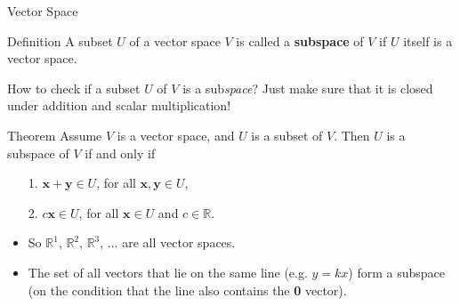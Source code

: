 \documentclass{beamer}
\newcommand{\vx}{\mathbf{x}}
\newcommand{\vy}{\mathbf{y}}
\newcommand{\R}{\mathbb{R}}
\begin{document}
\begin{frame}{Vector Space}
  \begin{block}{Definition}
   A subset $U$ of a vector space $V$ is called a \textbf{subspace} of $V$
 if $U$ itself is a vector space.
\end{block}

\pause How to check if a subset $U$ of $V$ is a sub\textit{space}? Just make sure that it is closed under addition and scalar multiplication!

\pause  \begin{block}{Theorem}
  Assume $V$ is a vector space, and $U$ is  a subset of $V$. Then $U$ is a subspace of $V$ if and only if 
      \begin{itemize}
          \item[1.] $\vx+\vy \in U$, for all $\vx,\vy\in U$,
          \item[2.] $c\vx \in U$, for all $\vx\in U$ and $c\in\R$.
      \end{itemize}
\end{block}

\pause

\begin{itemize}
    \item So $\R^1$, $\R^2$, $\R^3$, $\dots$ are all vector spaces. 
    \item The set of all vectors that lie on the same line (e.g. $y=kx$) form a  subspace (on the condition that  the line also contains the \textbf{0} vector).
\end{itemize}

  \end{frame}

         
\end{document}
